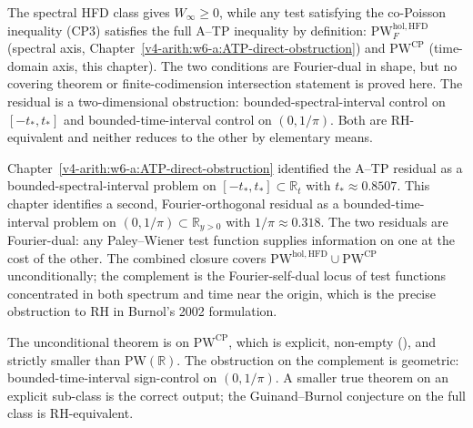 \begin{remark}
\label{v4-arith:w7-i:rem:honest-form}
The spectral HFD class gives \(W_{\infty}\ge0\), while any test
satisfying the co-Poisson inequality (CP3) satisfies the full A--TP
inequality by definition:
\(\mathrm{PW}^{\mathrm{hol},\mathrm{HFD}}_{F}\) (spectral axis,
Chapter~\ref{v4-arith:w6-a:ATP-direct-obstruction}) and
\(\mathrm{PW}^{\mathrm{CP}}\) (time-domain axis, this chapter).
The two conditions are Fourier-dual in shape, but no covering theorem
or finite-codimension intersection statement is proved here. The
residual is a two-dimensional obstruction:
bounded-spectral-interval control on \([-t_{\ast},t_{\ast}]\) and
bounded-time-interval control on \((0,1/\pi)\). Both are
RH-equivalent and neither reduces to the other by elementary means.
\end{remark}

\begin{remark}
\label{v4-arith:w7-i:rem:compare-w6}
Chapter~\ref{v4-arith:w6-a:ATP-direct-obstruction} identified the A--TP
residual as a bounded-spectral-interval problem on
\([-t_{\ast},t_{\ast}]\subset\mathbb{R}_{t}\) with
\(t_{\ast}\approx 0.8507\). This chapter identifies a second,
Fourier-orthogonal residual as a bounded-time-interval problem on
\((0,1/\pi)\subset\mathbb{R}_{y>0}\) with \(1/\pi\approx 0.318\). The
two residuals are Fourier-dual: any Paley--Wiener test function
supplies information on one at the cost of the other. The combined
closure covers
\(\mathrm{PW}^{\mathrm{hol},\mathrm{HFD}}\cup\mathrm{PW}^{\mathrm{CP}}\)
unconditionally; the complement is the Fourier-self-dual locus of
test functions concentrated in both spectrum and time near the
origin, which is the precise obstruction to RH in Burnol's 2002
formulation.
\end{remark}

\begin{remark}[domain]
\label{v4-arith:w7-i:rem:beilinson}
The unconditional theorem is on \(\mathrm{PW}^{\mathrm{CP}}\), which
is explicit, non-empty
(), and strictly smaller than
\(\mathrm{PW}(\mathbb{R})\). The obstruction on the complement is
geometric: bounded-time-interval sign-control on \((0,1/\pi)\). A
smaller true theorem on an explicit sub-class is the correct output;
the Guinand--Burnol conjecture on the full class is RH-equivalent.
\end{remark}
